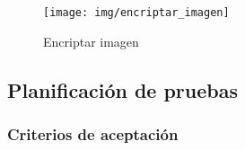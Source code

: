                 \begin{figure}[h]
                	\centering
                	\texttt{[image: img/encriptar\_imagen]}
                	\caption{Encriptar imagen}
                	\label{encriptar_imagen}
                \end{figure}

\newpage

\subsection{Planificación de pruebas}                
\subsubsection{Criterios de aceptación}

